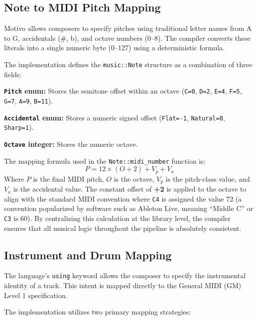 \subsection{Note to MIDI Pitch Mapping}\label{detail-subsec:note-to-midi-pitch-mapping}

Motivo allows composers to specify pitches using traditional letter names from A to G, accidentals (\#, b), and
octave numbers
(0--8).
The compiler converts these literals into a single numeric byte (0--127) using a deterministic formula.

The implementation defines the \texttt{music::Note} structure as a combination of three fields:

\noindent \textbf{\texttt{Pitch} enum:} Stores the semitone offset within an octave (\texttt{C=0}, \texttt{D=2},
\texttt{E=4}, \texttt{F=5}, \texttt{G=7}, \texttt{A=9}, \texttt{B=11}).

\noindent \textbf{\texttt{Accidental} enum:} Stores a numeric signed offset (\texttt{Flat=-1}, \texttt{Natural=0},
\texttt{Sharp=1}).

\noindent \textbf{\texttt{Octave} integer:} Stores the numeric octave.

The mapping formula used in the \texttt{Note::midi\_number} function is:
\begin{equation}
  P = 12 \times (O + 2) + V_p + V_a\label{detail-eq:equation}
\end{equation}
Where $P$ is the final MIDI pitch, $O$ is the octave, $V_p$ is the pitch-class value, and $V_a$ is the accidental value.
The constant offset of \textbf{+2} is applied to the octave to align with the standard MIDI convention where \texttt{C4}
is assigned the value 72 (a convention popularized by software such as Ableton Live, meaning ``Middle C'' or \texttt{C3}
is 60).
By centralizing this calculation at the library level, the compiler ensures that all musical logic throughout the
pipeline is absolutely consistent.

\subsection{Instrument and Drum Mapping}\label{detail-subsec:instrument-and-drum-mapping}

The language's \texttt{using} keyword allows the composer to specify the instrumental identity of a track.
This intent is mapped directly to the General MIDI (GM) Level 1 specification.

The implementation utilizes two primary mapping strategies:

